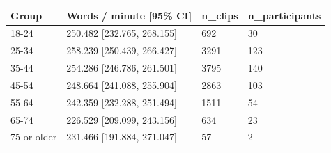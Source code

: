 \begin{tabular}{llll}
\toprule
Group & Words / minute [95\% CI] & n\_clips & n\_participants \\
\midrule
18-24 & 250.482 [232.765, 268.155] & 692 & 30 \\
25-34 & 258.239 [250.439, 266.427] & 3291 & 123 \\
35-44 & 254.286 [246.786, 261.501] & 3795 & 140 \\
45-54 & 248.664 [241.088, 255.904] & 2863 & 103 \\
55-64 & 242.359 [232.288, 251.494] & 1511 & 54 \\
65-74 & 226.529 [209.099, 243.156] & 634 & 23 \\
75 or older & 231.466 [191.884, 271.047] & 57 & 2 \\
\bottomrule
\end{tabular}
